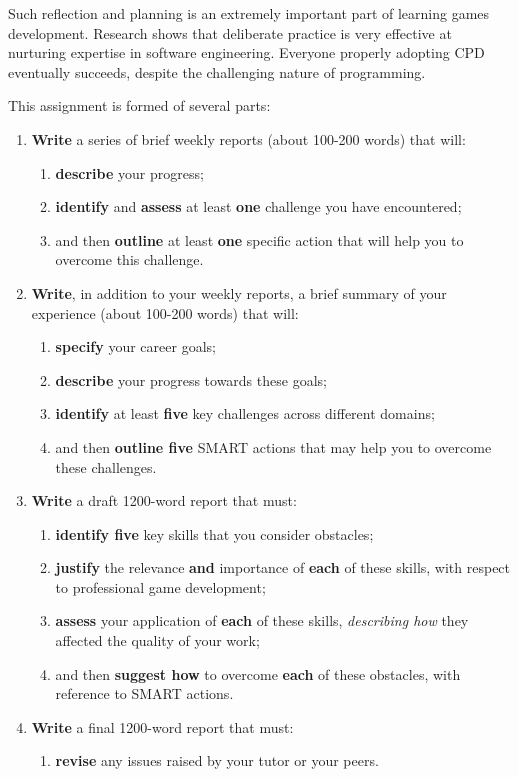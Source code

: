 \documentclass{../fal_assignment}
\begin{document}
Such reflection and planning is an extremely important part of learning games development. Research shows that deliberate practice is very effective at nurturing expertise in software engineering. Everyone properly adopting CPD eventually succeeds, despite the challenging nature of programming.

This assignment is formed of several parts:

\begin{enumerate}[label=(\Alph*)]
    \item \textbf{Write} a series of brief weekly reports (about 100-200 words) that will:
    	\begin{enumerate}[label=\roman*.]
    		\item \textbf{describe} your progress;
    		\item \textbf{identify} and \textbf{assess} at least \textbf{one} challenge you have encountered;
    		\item and then \textbf{outline} at least \textbf{one} specific action that will help you to overcome this challenge.
	\end{enumerate}
	    \item \textbf{Write}, in addition to your weekly reports, a brief summary of your experience (about 100-200 words) that will:
    	\begin{enumerate}[label=\roman*.]
    		\item \textbf{specify} your career goals;
    		\item \textbf{describe} your progress towards these goals;
    		\item \textbf{identify} at least \textbf{five} key challenges across different domains;
    		\item and then \textbf{outline five} SMART actions that may help you to overcome these challenges.
	\end{enumerate}
    \item \textbf{Write} a draft 1200-word report that must:
    	\begin{enumerate}[label=\roman*.]
    		\item \textbf{identify five} key skills that you consider obstacles;
    		\item \textbf{justify} the relevance \textbf{and} importance of \textbf{each} of these skills, with respect to professional game development;
    		\item \textbf{assess} your application of \textbf{each} of these skills, \textit{describing how} they affected the quality of your work;
    		\item and then \textbf{suggest how} to overcome \textbf{each} of these obstacles, with reference to SMART actions.
	\end{enumerate}
    \item \textbf{Write} a final 1200-word report that must:
    	\begin{enumerate}[label=\roman*.]
    		\item \textbf{revise} any issues raised by your tutor or your peers.
	\end{enumerate}
\end{enumerate}
\end{document}

